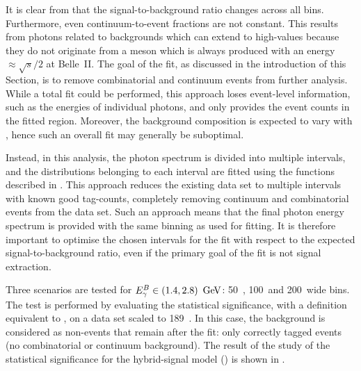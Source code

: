 It is clear from  that the signal-to-background ratio changes across all \EB bins.
Furthermore, even continuum-to-\BB event fractions are not constant.
This results from photons related to \epem\ra\qqbar backgrounds which can extend to high-\EB values because they do not originate from a \B meson which is always produced with an \mbox{energy $\approx\sqrt{s}/2$} at Belle~II.
The goal of the fit, as discussed in the introduction of this Section, is to remove combinatorial \BB and continuum events from further analysis.
While a total \Mbc fit could be performed, this approach loses event-level information, such as the energies of individual photons, and only provides the event counts in the fitted \EB region.
Moreover, the background composition is expected to vary with \EB, hence such an overall fit may generally be suboptimal.

Instead, in this analysis, the photon spectrum is divided into multiple \EB intervals, and the \Mbc distributions belonging to each interval are fitted using the functions described in .
This approach reduces the existing data set to multiple \EB intervals with known good tag-\B counts, completely removing continuum and combinatorial \BB events from the data set.
Such an approach means that the final photon energy spectrum is provided with the same binning as used for fitting.
It is therefore important to optimise the chosen intervals for the fit with respect to the expected \BtoXsgamma signal-to-background ratio, 
even if the primary goal of the fit is not signal extraction.

Three scenarios are tested for ${E^B_{\gamma}}\in(1.4,2.8)~\mathrm{\,Ge\kern -0.1em V}$: 50~\mev, 100~\mev and 200~\mev wide bins.
The test is performed by evaluating the statistical significance, with a definition equivalent to , on a data set scaled to 189~\invfb.
In this case, the background is considered as non-\BtoXsgamma events that remain after the \Mbc fit: only correctly tagged \BB events (no combinatorial or continuum background).
The result of the study of the statistical significance for the hybrid-signal model () is shown in .

